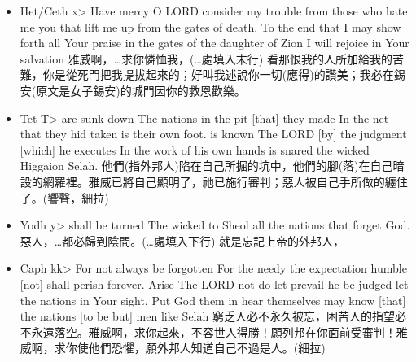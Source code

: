 \begin{itemize}
\item Het/Ceth  \<x> Have mercy O LORD consider my trouble from those who hate me you that lift me up from the gates of death. To the end that I may show forth all Your praise in the gates of the daughter of Zion I will rejoice in Your salvation 雅威啊，…求你憐恤我，(…處填入末行) 看那恨我的人所加給我的苦難，你是從死門把我提拔起來的；好叫我述說你一切(應得)的讚美；我必在錫安(原文是女子錫安)的城門因你的救恩歡樂。
\item Tet  \<T> are sunk down The nations in the pit [that] they made In the net that they hid taken is their own foot. is known The LORD [by] the judgment [which] he executes In the work of his own hands is snared the wicked Higgaion Selah. 他們(指外邦人)陷在自己所掘的坑中，他們的腳(落)在自己暗設的網羅裡。雅威已將自己顯明了，祂已施行審判；惡人被自己手所做的纏住了。(響聲，細拉)
\item Yodh \<y> shall be turned The wicked to Sheol all the nations that forget God. 惡人，…都必歸到陰間。(…處填入下行) 就是忘記上帝的外邦人，
\item Caph \<kk> For not always be forgotten For the needy the expectation humble [not] shall perish forever. Arise The LORD not do let prevail he be judged let the nations in Your sight. Put God them in hear themselves may know [that] the nations [to be but] men like Selah 窮乏人必不永久被忘，困苦人的指望必不永遠落空。雅威啊，求你起來，不容世人得勝！願列邦在你面前受審判！雅威啊，求你使他們恐懼，願外邦人知道自己不過是人。(細拉)
\end{itemize}


